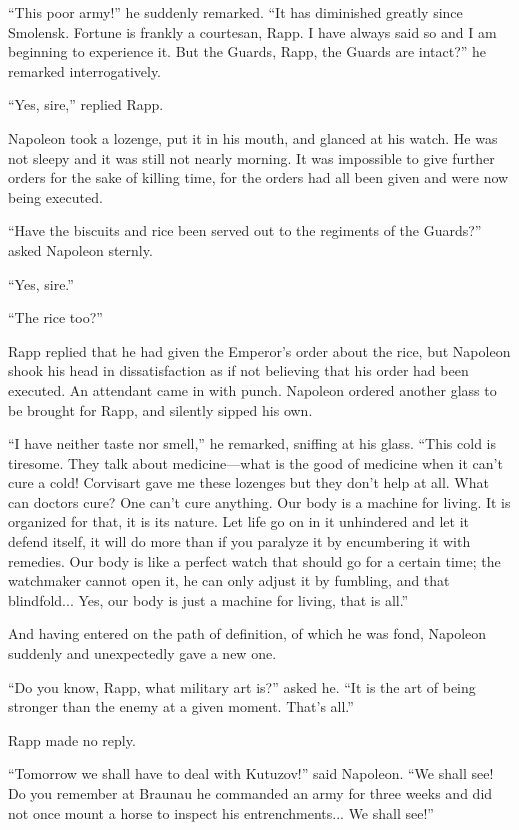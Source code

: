 ``This poor army!'' he suddenly remarked. ``It has diminished
greatly since Smolensk. Fortune is frankly a courtesan, Rapp. I
have always said so and I am beginning to experience it. But the
Guards, Rapp, the Guards are intact?'' he remarked
interrogatively.

``Yes, sire,'' replied Rapp.

Napoleon took a lozenge, put it in his mouth, and glanced at his
watch.  He was not sleepy and it was still not nearly morning. It
was impossible to give further orders for the sake of killing
time, for the orders had all been given and were now being
executed.

``Have the biscuits and rice been served out to the regiments of
the Guards?'' asked Napoleon sternly.

``Yes, sire.''

``The rice too?''

Rapp replied that he had given the Emperor's order about the
rice, but Napoleon shook his head in dissatisfaction as if not
believing that his order had been executed. An attendant came in
with punch. Napoleon ordered another glass to be brought for
Rapp, and silently sipped his own.

``I have neither taste nor smell,'' he remarked, sniffing at his
glass.  ``This cold is tiresome. They talk about medicine---what
is the good of medicine when it can't cure a cold! Corvisart gave
me these lozenges but they don't help at all. What can doctors
cure? One can't cure anything.  Our body is a machine for
living. It is organized for that, it is its nature. Let life go
on in it unhindered and let it defend itself, it will do more
than if you paralyze it by encumbering it with remedies.  Our
body is like a perfect watch that should go for a certain time;
the watchmaker cannot open it, he can only adjust it by fumbling,
and that blindfold... Yes, our body is just a machine for living,
that is all.''

And having entered on the path of definition, of which he was
fond, Napoleon suddenly and unexpectedly gave a new one.

``Do you know, Rapp, what military art is?'' asked he. ``It is
the art of being stronger than the enemy at a given
moment. That's all.''

Rapp made no reply.

``Tomorrow we shall have to deal with Kutuzov!'' said
Napoleon. ``We shall see! Do you remember at Braunau he commanded
an army for three weeks and did not once mount a horse to inspect
his entrenchments... We shall see!''

